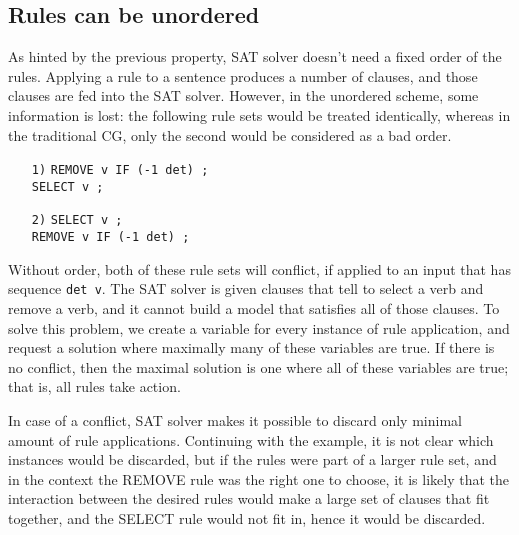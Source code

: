 \documentclass[11pt]{article}
\newcommand{\todo}[1]{{\color{cyan}\textbf{[TODO: }#1\textbf{]}}}
\begin{document}



\subsection{Rules can be unordered}
\label{sec:unord}

As hinted by the previous property, SAT solver doesn't need a fixed
order of the rules.
Applying a rule to a sentence produces a number of clauses,
and those clauses are fed into the SAT solver.
However, in the unordered scheme, some information is lost: the
following rule sets would be treated identically, whereas in the
traditional CG, only the second would be considered as a bad order.

\begin{itemize}
\item [\texttt{1)}] \texttt{REMOVE v IF (-1 det) ;} \\
         \texttt{SELECT v ;}
\item [\texttt{2)}] \texttt{SELECT v ;} \\
         \texttt{REMOVE v IF (-1 det) ;} 
\end{itemize}

Without order, both of these rule sets will conflict, if applied to an
input that has sequence \texttt{det v}.
The SAT solver is given clauses that tell to select a verb and remove a
verb, and it cannot build a model that satisfies all of those clauses.
To solve this problem, we create a variable for every instance of rule application, and request a solution where maximally many of these variables are true.
If there is no conflict, then the maximal solution is one where all of
these variables are true; that is, all rules take action.


In case of a conflict, SAT solver makes it possible to discard only
minimal amount of rule applications. Continuing with the example,
it is not clear which instances would be discarded, but if the rules
were part of a larger rule set, and in the context the REMOVE rule was
the right one to choose, it is likely that the interaction between the desired
rules would make a large set of clauses that fit together, and the
SELECT rule would not fit in, hence it would be discarded. 
\end{document}
